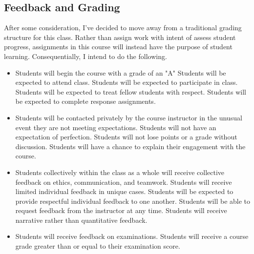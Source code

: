 \documentclass[11pt]{article}
\begin{document}
\subsection*{Feedback and Grading}
After some consideration, I've decided to move away from a traditional grading structure for this class. Rather than assign work with intent of assess student progress, assignments in this course will instead have the purpose of student learning. Consequentially, I intend to do the following.
\begin{itemize}
	\item Students will begin the course with a grade of an "A"
	\subitem Students will be expected to attend class.
	\subitem Students will be expected to participate in class.
	\subitem Students will be expected to treat fellow students with respect.
	\subitem Students will be expected to complete response assignments.
	\item Students will be contacted privately by the course instructor in the unusual event they are not meeting expectations.
	\subitem Students will not have an expectation of perfection.
	\subitem Students will not lose points or a grade without discussion.
	\subitem Students will have a chance to explain their engagement with the course.
	\item Students collectively within the class as a whole will receive collective feedback on ethics, communication, and teamwork.
	\subitem Students will receive limited individual feedback in unique cases.
	\subitem Students will be expected to provide respectful individual feedback to one another.
	\subitem Students will be able to request feedback from the instructor at any time.
	\subitem Students will receive narrative rather than quantitative feedback.
	\item Students will receive feedback on examinations.
	\subitem Students will receive a course grade greater than or equal to their examination score.
\end{itemize}


\end{document}
